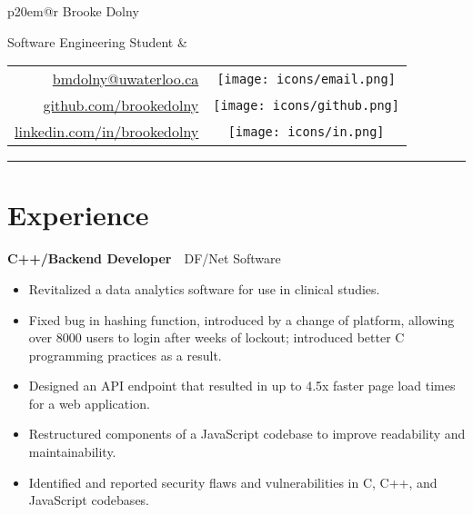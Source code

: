 \documentclass[oneside, 12pt]{memoir}
\newcommand{\TitleFont}[1]{\textnormal{\fontsize{40pt}{0}\selectfont #1}}
\newcommand{\entryGeneral}[4]{
  \begin{adjustwidth}{0.3em}{0em}%
  \textbf{#1}~\cdot~#2\sourceatright{\Date \small #3}%
  \begin{adjustwidth}{0.5em}{2.0em}
    \begin{flushleft}
      {\Merriweather \small #4}%
    \end{flushleft}
  \end{adjustwidth}
  \end{adjustwidth}
  \hfill
}
\newcommand{\github}{\texttt{[image: icons/github.png]}}
\newcommand{\linkedin}{\texttt{[image: icons/in.png]}}
\newcommand{\email}{\texttt{[image: icons/email.png]}}
\newcommand{\phone}{\texttt{[image: icons/phone.png]}}
\begin{document}
\color{textcolor}

\begin{tabular*}{\textwidth}{p{20em}@{\extracolsep{\fill}}r}%
  \TitleFont{\color{titlecolor} Brooke Dolny}

  {\textnormal{Software Engineering Student}}
  &
  \begin{tabular}{rc}
    \url{bmdolny@uwaterloo.ca} & \email\\
    \url{github.com/brookedolny} & \github\\
    \url{linkedin.com/in/brookedolny} & \linkedin
    \vspace{-0.1em}
    \end{tabular}%
\end{tabular*}
{\color{titlecolor} \rule{\textwidth}{0.1em}}
%
\section*{Experience}

\entryGeneral{C++/Backend Developer}{DF/Net Software}{May 2018---Aug 2018}{
  \begin{itemize}
    \itemsep 0.25em
    \item{
      Revitalized a data analytics software for use in clinical studies.
    }
    \item{
      Fixed bug in hashing function, introduced by a change of platform,
      allowing over 8000 users to login after weeks of lockout; introduced
      better C programming practices as a result.
    }
    \item{
      Designed an API endpoint that resulted in up to 4.5x faster page load
      times for a web application.
    }
    \item{
      Restructured components of a JavaScript codebase to improve readability
      and maintainability.
    }
    \item{
      Identified and reported security flaws and vulnerabilities in C, C++, and
      JavaScript codebases.
    }
  \end{itemize}
}
\end{document}

